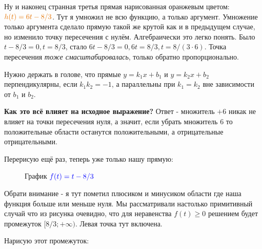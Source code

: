 \documentclass{article}
\begin{document}
Ну и наконец странная третья прямая нарисованная оранжевым цветом: $\color{black!10!orange}h(t)=6t-8/3$. Тут я умножил не всю функцию, а только аргумент. Умножение только аргумента сделало прямую такой же крутой как и в предыдущем случае, но изменило точку пересечения с нулём. Алгебраически это легко понять. Было $t-8/3=0,t=8/3$, стало $6t-8/3=0,6t=8/3,t=8/(3\cdot{}6)$. Точка пересечения \emph{тоже смасштабировалась}, только обратно пропорционально.

Нужно держать в голове, что прямые $y=k_1x+b_1$ и $y=k_2x+b_2$ перпендикулярны, если $k_1k_2=-1$, а параллельны при $k_1=k_2$ вне зависимости от $b_1$ и $b_2$.

\textbf{Как это всё влияет на исходное выражение?} Ответ - множитель $+6$ никак не влияет на точки пересечения нуля, а значит, если убрать множитель $6$ то положительные области останутся положительными, а отрицательные отрицательными.

Перерисую ещё раз, теперь уже только нашу прямую:
\begin{figure}[H]
\centering
{}
\caption{График $\color{blue}f(t)=t-8/3$}
\label{fig:f2}
\end{figure}

Обрати внимание - я тут пометил плюсиком и минусиком области где наша функция больше или меньше нуля. Мы рассматривали настолько примитивный случай что из рисунка очевидно, что для неравенства $f(t)\ge{}0$ решением будет промежуток $[8/3;+\infty)$. Левая точка тут включена.

Нарисую этот промежуток:
\begin{center}
\end{center}
\end{document}

